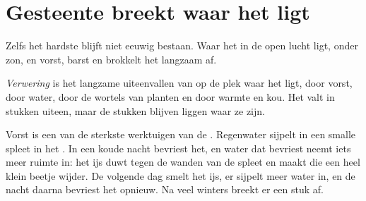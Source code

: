 \section{Gesteente breekt waar het ligt}

Zelfs het hardste  blijft niet eeuwig bestaan. Waar het in de open
lucht ligt, onder zon,  en vorst, barst en brokkelt het langzaam af.

\begin{definition}[Verwering]\label{def:g5:water-shapes-the-land:weathering}
\emph{Verwering} is het langzame uiteenvallen van 
op de plek waar het ligt, door vorst, door water, door de wortels van
planten en door warmte en kou. Het  valt in stukken uiteen, maar
de stukken blijven liggen waar ze zijn.
\end{definition}

Vorst is een van de sterkste werktuigen van de . Regenwater
sijpelt in een smalle spleet in het . In een koude nacht bevriest
het, en water dat bevriest neemt iets meer ruimte in: het ijs duwt tegen de
wanden van de spleet en maakt die een heel klein beetje wijder. De volgende
dag smelt het ijs, er sijpelt meer water in, en de nacht daarna bevriest
het opnieuw. Na veel winters breekt er een stuk  af.

